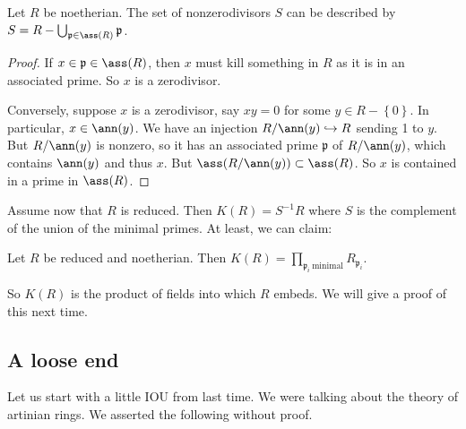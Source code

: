 \begin{proposition} Let $R$ be noetherian. The set of nonzerodivisors $S$ can be described by
$S = R- \bigcup_{\mathfrak{p} \in \ass(R)} \mathfrak{p}$.
\end{proposition} 
\begin{proof} 
If $x \in\mathfrak{p} \in \ass(R)$, then $x$ must kill something in $R$ as it
is in an associated prime. 	So $x$ is a zerodivisor. 

Conversely, suppose $x$ is a zerodivisor, say $xy = 0$ for some $y \in R -
\left\{0\right\}$. In
particular, $x \in \ann(y)$. We have an injection $R/\ann(y) \hookrightarrow R$
sending 1 to $y$. But $R/\ann(y)$ is nonzero, so it has an associated prime
$\mathfrak{p}$ of $R/\ann(y)$, which contains $\ann(y)$ and thus $x$. But $\ass(R/\ann(y)) \subset \ass(R)$. 
So $x$ is contained in a prime in $\ass(R)$. 
\end{proof} 

Assume now that $R$ is reduced.  Then $K(R)  = S^{-1}R$ where $S$ is the
complement of the union of the minimal primes. 
At least, we can claim:

\begin{proposition} Let $R$ be reduced and noetherian. Then
$K(R) = \prod_{\mathfrak{p}_i \ \mathrm{minimal}} R_{\mathfrak{p}_i}$.
\end{proposition} 

So $K(R)$ is the product of fields into which $R$ embeds.  
We will give a proof of this next time. 

\subsection{A loose end}
Let us start with a little IOU from last time.
We were talking about the theory of artinian rings. We asserted the following
without proof.

